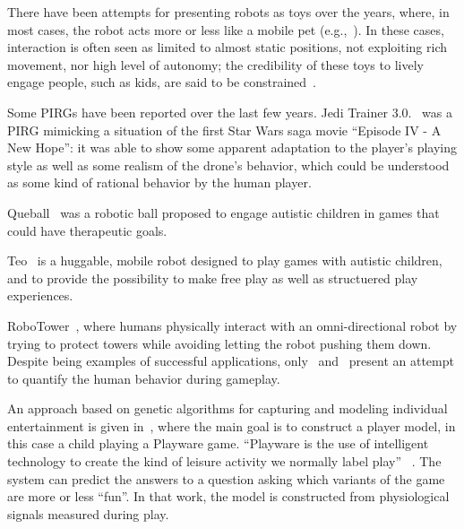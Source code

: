 There have been attempts for presenting robots as toys over the years, where, in most cases, the robot acts more or less like a mobile pet (e.g.,~\cite{fujita_open_1997, brooks_robots_2004}). In these cases, interaction is often seen as limited to almost static positions, not exploiting rich movement, nor high level of autonomy; the credibility of these toys to lively engage people, such as kids, are said to be constrained~\cite{martinoia_physically_2013, bonarini_timing_2014}. 

Some PIRGs have been reported over the last few years. Jedi Trainer 3.0.~\cite{martinoia_physically_2013} was a PIRG mimicking a situation of the first Star Wars saga movie ``Episode IV - A New Hope'': it was able to show some apparent adaptation to the player's playing style as well as some realism of the drone's behavior, which could be understood as some kind of rational behavior by the human player.

Queball~\cite{salter2014designing} was a robotic ball proposed to engage autistic children in games that could have therapeutic goals.

Teo~\cite{bonarini2016huggable} is a huggable, mobile robot designed to play games with autistic children, and to provide the possibility to make free play as well as structuered play experiences.

RoboTower~\cite{oliveira_learning_2017, oliveira_activity_2017, oliveira_modeling_2017}, where humans physically interact with an omni-directional robot by trying to protect towers while avoiding letting the robot pushing them down.
Despite being examples of successful applications, only~\cite{oliveira_learning_2017} and~\cite{oliveira_modeling_2017} present an attempt to quantify the human behavior during gameplay.%

An approach based on genetic algorithms for capturing and modeling individual entertainment is given in~\cite{yannakakis_entertainment_2008}, where the main goal is to construct a player model, in this case a child playing a Playware game. ``Playware is the use of intelligent technology to create the kind of leisure activity we normally label play''%
~\cite{lund_playware_2005}. The system can predict the answers to a question asking which variants of the game are more or less ``fun''. In that work, the model is constructed from physiological signals measured during play. 

